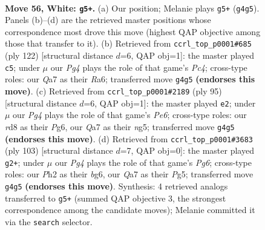 \documentclass[11pt]{article}
\begin{document}
\clearpage

\begin{figure}[p]\centering
\begin{subfigure}{0.46\textwidth}\centering
\resizebox{\linewidth}{!}{%
\newchessgame
\chessboard[
  setfen={3r4/Q7/5k2/8/4P1P1/8/7P/1K6 w - - 1 56},
  showmover=false,
  pgfstyle=straightmove, color=movearrow, markmove={g4-g5}
]}
\caption{}
\end{subfigure}\hfill
\begin{subfigure}{0.46\textwidth}\centering
\resizebox{\linewidth}{!}{%
\newchessgame
\chessboard[
  setfen={8/8/R7/4k1p1/2P3P1/7r/1K6/8 w - - 0 62},
  showmover=false,
  pgfstyle=straightmove, color=movearrow, markmove={c4-c5}
]}
\caption{}
\end{subfigure}
\\[4pt]
\begin{subfigure}{0.46\textwidth}\centering
\resizebox{\linewidth}{!}{%
\newchessgame
\chessboard[
  setfen={8/4k3/6pP/6N1/p7/4p3/2K5/8 b - - 1 48},
  showmover=false,
  pgfstyle=straightmove, color=movearrow, markmove={e3-e2}
]}
\caption{}
\end{subfigure}\hfill
\begin{subfigure}{0.46\textwidth}\centering
\resizebox{\linewidth}{!}{%
\newchessgame
\chessboard[
  setfen={8/8/6B1/2p1k1p1/8/6p1/8/5K2 b - - 1 52},
  showmover=false,
  pgfstyle=straightmove, color=movearrow, markmove={g3-g2}
]}
\caption{}
\end{subfigure}
\caption{\textbf{Move 56, White: \texttt{g5+}.} (a) Our position; Melanie plays \texttt{g5+} (\texttt{g4g5}). Panels (b)--(d) are the retrieved master positions whose correspondence most drove this move (highest QAP objective among those that transfer to it). (b) Retrieved from \texttt{ccrl\_top\_p0001\#685} (ply 122) [structural distance $d$=6, QAP obj=1]: the master played \texttt{c5}; under $\mu$ our \emph{Pg4} plays the role of that game's \emph{Pc4}; cross-type roles: our \emph{Q}a7 as their \emph{R}a6; transferred move \texttt{g4g5} \textbf{(endorses this move)}. (c) Retrieved from \texttt{ccrl\_top\_p0001\#2189} (ply 95) [structural distance $d$=6, QAP obj=1]: the master played \texttt{e2}; under $\mu$ our \emph{Pg4} plays the role of that game's \emph{Pe6}; cross-type roles: our \emph{r}d8 as their \emph{P}g6, our \emph{Q}a7 as their \emph{n}g5; transferred move \texttt{g4g5} \textbf{(endorses this move)}. (d) Retrieved from \texttt{ccrl\_top\_p0001\#3683} (ply 103) [structural distance $d$=7, QAP obj=0]: the master played \texttt{g2+}; under $\mu$ our \emph{Pg4} plays the role of that game's \emph{Pg6}; cross-type roles: our \emph{P}h2 as their \emph{b}g6, our \emph{Q}a7 as their \emph{P}g5; transferred move \texttt{g4g5} \textbf{(endorses this move)}. Synthesis: 4 retrieved analogs transferred to \texttt{g5+} (summed QAP objective 3, the strongest correspondence among the candidate moves); Melanie committed it via the \texttt{search} selector.}
\label{fig:thought-m110}
\end{figure}
\end{document}
